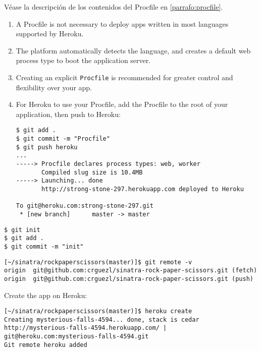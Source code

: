 Véase la descripción de los contenidos del Procfile en
\ref{parrafo:procfile}.

\begin{enumerate}
\item 
A Procfile is not necessary to deploy apps written in most languages
supported by Heroku. 

\item 
The platform automatically detects the language,
and creates a default web process type to boot the application
server.

\item 
Creating an explicit \verb|Procfile| is recommended for greater control and flexibility over your app.

\item 
For Heroku to use your Procfile, add the Procfile to the root of your application, then push to Heroku:

\begin{verbatim}
$ git add .
$ git commit -m "Procfile"
$ git push heroku
...
-----> Procfile declares process types: web, worker
       Compiled slug size is 10.4MB
-----> Launching... done
       http://strong-stone-297.herokuapp.com deployed to Heroku

To git@heroku.com:strong-stone-297.git
 * [new branch]      master -> master
\end{verbatim}
\end{enumerate}


\begin{verbatim}
$ git init
$ git add .
$ git commit -m "init"
\end{verbatim}

\begin{verbatim}
[~/sinatra/rockpaperscissors(master)]$ git remote -v
origin  git@github.com:crguezl/sinatra-rock-paper-scissors.git (fetch)
origin  git@github.com:crguezl/sinatra-rock-paper-scissors.git (push)
\end{verbatim}


Create the app on Heroku:
\begin{verbatim}
[~/sinatra/rockpaperscissors(master)]$ heroku create
Creating mysterious-falls-4594... done, stack is cedar
http://mysterious-falls-4594.herokuapp.com/ | git@heroku.com:mysterious-falls-4594.git
Git remote heroku added
\end{verbatim}

